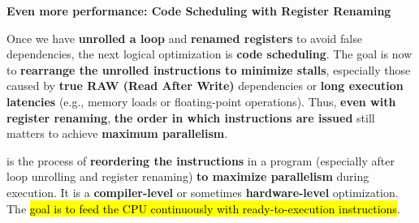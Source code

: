 \begin{flushleft}
    \textcolor{Green3}{ \textbf{Even more performance: Code Scheduling with Register Renaming}}
\end{flushleft}
Once we have \textbf{unrolled a loop} and \textbf{renamed registers} to avoid false dependencies, the next logical optimization is \textbf{code scheduling}. The goal is now to \textbf{rearrange the unrolled instructions to minimize stalls}, especially those caused by \textbf{true RAW (Read After Write)} dependencies or \textbf{long execution latencies} (e.g., memory loads or floating-point operations). Thus, \textbf{even with register renaming}, \textbf{the order in which instructions are issued} still matters to achieve \textbf{maximum parallelism}.

\highspace
{} is the process of \textbf{reordering the instructions} in a program (especially after loop unrolling and register renaming) \textbf{to maximize parallelism} during execution. It is a \textbf{compiler-level} or sometimes \textbf{hardware-level} optimization. The \hl{goal is to feed the CPU continuously with ready-to-execution instructions}.

